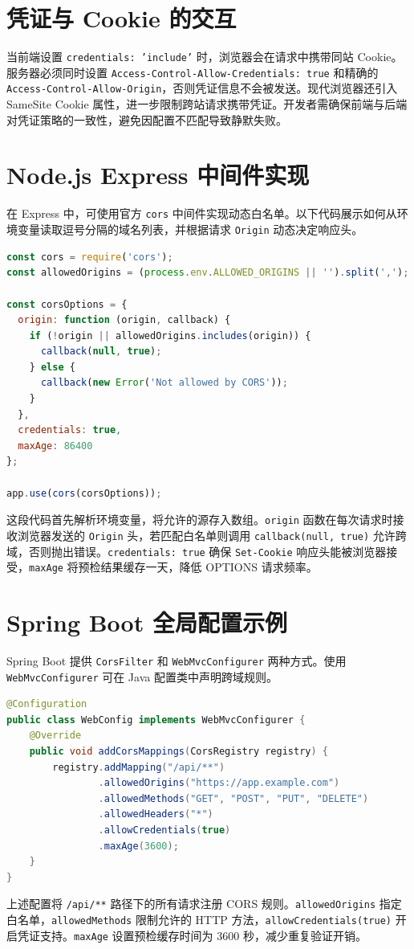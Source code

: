 \chapter{凭证与 Cookie 的交互}
当前端设置 \texttt{credentials: 'include'} 时，浏览器会在请求中携带同站 Cookie。服务器必须同时设置 \texttt{Access-Control-Allow-Credentials: true} 和精确的 \texttt{Access-Control-Allow-Origin}，否则凭证信息不会被发送。现代浏览器还引入 SameSite Cookie 属性，进一步限制跨站请求携带凭证。开发者需确保前端与后端对凭证策略的一致性，避免因配置不匹配导致静默失败。\par
\chapter{Node.js Express 中间件实现}
在 Express 中，可使用官方 \texttt{cors} 中间件实现动态白名单。以下代码展示如何从环境变量读取逗号分隔的域名列表，并根据请求 \texttt{Origin} 动态决定响应头。\par
\begin{lstlisting}[language=js]
const cors = require('cors');
const allowedOrigins = (process.env.ALLOWED_ORIGINS || '').split(',');

const corsOptions = {
  origin: function (origin, callback) {
    if (!origin || allowedOrigins.includes(origin)) {
      callback(null, true);
    } else {
      callback(new Error('Not allowed by CORS'));
    }
  },
  credentials: true,
  maxAge: 86400
};

app.use(cors(corsOptions));
\end{lstlisting}
这段代码首先解析环境变量，将允许的源存入数组。\texttt{origin} 函数在每次请求时接收浏览器发送的 \texttt{Origin} 头，若匹配白名单则调用 \texttt{callback(null, true)} 允许跨域，否则抛出错误。\texttt{credentials: true} 确保 \texttt{Set-Cookie} 响应头能被浏览器接受，\texttt{maxAge} 将预检结果缓存一天，降低 OPTIONS 请求频率。\par
\chapter{Spring Boot 全局配置示例}
Spring Boot 提供 \texttt{CorsFilter} 和 \texttt{WebMvcConfigurer} 两种方式。使用 \texttt{WebMvcConfigurer} 可在 Java 配置类中声明跨域规则。\par
\begin{lstlisting}[language=java]
@Configuration
public class WebConfig implements WebMvcConfigurer {
    @Override
    public void addCorsMappings(CorsRegistry registry) {
        registry.addMapping("/api/**")
                .allowedOrigins("https://app.example.com")
                .allowedMethods("GET", "POST", "PUT", "DELETE")
                .allowedHeaders("*")
                .allowCredentials(true)
                .maxAge(3600);
    }
}
\end{lstlisting}
上述配置将 \texttt{/api/**} 路径下的所有请求注册 CORS 规则。\texttt{allowedOrigins} 指定白名单，\texttt{allowedMethods} 限制允许的 HTTP 方法，\texttt{allowCredentials(true)} 开启凭证支持。\texttt{maxAge} 设置预检缓存时间为 3600 秒，减少重复验证开销。\par
